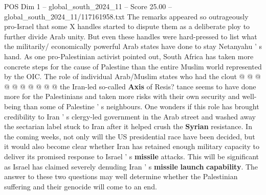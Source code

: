 \begin{textsample}{POS Dim 1 – global\_south\_2024\_11 – Score 25.00 – global\_south\_2024\_11/117161958.txt}
The remarks appeared so outrageously pro-Israel that some X handles started to dispute them as a deliberate ploy to further divide Arab unity.
But even these handles were hard-pressed to list what the militarily/ economically powerful Arab states have done to stay Netanyahu ' s hand.
As one pro-Palestinian activist pointed out, South Africa has taken more concrete steps for the cause of Palestine than the entire Muslim world represented by the OIC.
The role of individual Arab/Muslim states who had the clout @ @ @ @ @ @ @ @ @ @ the Iran-led so-called \textbf{Axis} of Resis? tance seems to have done more for the Palestinians and taken more risks with their own security and well-being than some of Palestine ' s neighbours.
One wonders if this role has brought credibility to Iran ' s clergy-led government in the Arab street and washed away the sectarian label stuck to Iran after it helped crush the \textbf{Syrian} resistance.
In the coming weeks, not only will the US presidential race have been decided, but it would also become clear whether Iran has retained enough military capacity to deliver its promised response to Israel ' s \textbf{missile} attacks.
This will be significant as Israel has claimed severely denuding Iran ' s \textbf{missile} \textbf{launch} \textbf{capability}.
The answer to these two questions may well determine whether the Palestinian suffering and their genocide will come to an end.

\end{textsample}
